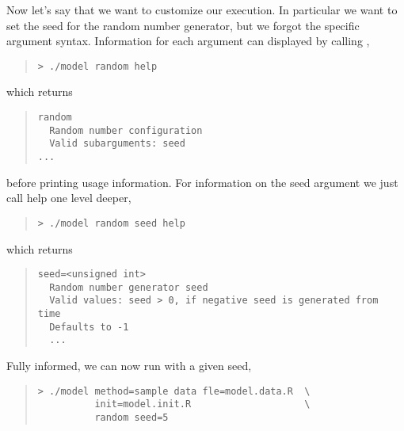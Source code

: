 Now let's say that we want to customize our execution.  In
particular we want to set the seed for the random number generator,
but we forgot the specific argument syntax.  Information for each
argument can displayed by calling ,
%
\begin{quote}
\begin{Verbatim}[fontshape=sl]
> ./model random help
\end{Verbatim}
\end{quote}
%
which returns
%
\begin{quote}
\begin{Verbatim}
random
  Random number configuration
  Valid subarguments: seed
...
\end{Verbatim}
\end{quote}
%
before printing usage information.  For information on the
seed argument we just call help one level deeper,
%
\begin{quote}
\begin{Verbatim}[fontshape=sl]
> ./model random seed help
\end{Verbatim}
\end{quote}
%
which returns
%
\begin{quote}
\begin{Verbatim}
seed=<unsigned int>
  Random number generator seed
  Valid values: seed > 0, if negative seed is generated from time
  Defaults to -1
  ...
\end{Verbatim}
\end{quote}
%
Fully informed, we can now run with a given seed,
%
\begin{quote}
\begin{Verbatim}[fontshape=sl]
> ./model method=sample data fle=model.data.R  \
          init=model.init.R                    \
          random seed=5
\end{Verbatim}
\end{quote}

